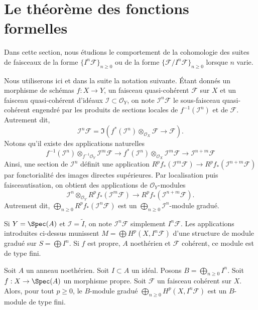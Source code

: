 \section{Le théorème des fonctions formelles}
\label{section-theorem-formal-functions}

\noindent
Dans cette section, nous étudions le comportement de la cohomologie
des suites de faisceaux de la forme $\{I^n\mathcal{F}\}_{n \geq 0}$
ou de la forme $\{\mathcal{F}/I^n\mathcal{F}\}_{n \geq 0}$ lorsque
$n$ varie.

\medskip\noindent
Nous utiliserons ici et dans la suite la notation suivante.
Étant donnés un morphisme de schémas $f : X \to Y$, un faisceau quasi-cohérent
$\mathcal{F}$ sur $X$ et un faisceau quasi-cohérent d'idéaux
$\mathcal{I} \subset \mathcal{O}_Y$, on note
$\mathcal{I}^n\mathcal{F}$ le sous-faisceau quasi-cohérent engendré
par les produits de sections locales de $f^{-1}(\mathcal{I}^n)$ et de
$\mathcal{F}$. Autrement dit,
$$
\mathcal{I}^n\mathcal{F}
=
\Im\left(
f^*(\mathcal{I}^n) \otimes_{\mathcal{O}_X} \mathcal{F}
\longrightarrow
\mathcal{F}
\right).
$$
Notons qu'il existe des applications naturelles
$$
f^{-1}(\mathcal{I}^n) \otimes_{f^{-1}\mathcal{O}_Y} \mathcal{I}^m\mathcal{F}
\longrightarrow
f^*(\mathcal{I}^n) \otimes_{\mathcal{O}_X} \mathcal{I}^m\mathcal{F}
\longrightarrow
\mathcal{I}^{n + m}\mathcal{F}
$$
Ainsi, une section de $\mathcal{I}^n$ définit une
application $R^pf_*(\mathcal{I}^m\mathcal{F}) \to
R^pf_*(\mathcal{I}^{n + m}\mathcal{F})$ par fonctorialité
des images directes supérieures. Par localisation puis faisceautisation, on
obtient des applications de $\mathcal{O}_Y$-modules
$$
\mathcal{I}^n \otimes_{\mathcal{O}_Y} R^pf_*(\mathcal{I}^m\mathcal{F})
\longrightarrow
R^pf_*(\mathcal{I}^{n + m}\mathcal{F}).
$$
Autrement dit,
$\bigoplus_{n \geq 0} R^pf_*(\mathcal{I}^n\mathcal{F})$
est un $\bigoplus_{n \geq 0} \mathcal{I}^n$-module gradué.

\medskip\noindent
Si $Y = \Spec(A)$ et $\mathcal{I} = \widetilde{I}$, on note
$\mathcal{I}^n\mathcal{F}$ simplement $I^n\mathcal{F}$. Les applications
introduites ci-dessus munissent $M = \bigoplus H^p(X, I^n\mathcal{F})$ d'une
structure de module gradué sur $S = \bigoplus I^n$. Si $f$ est propre,
$A$ noethérien et $\mathcal{F}$ cohérent, ce module
est de type fini.

\begin{lemma}
\label{lemma-cohomology-powers-ideal-times-F}
\begin{reference}
\cite[III Cor 3.3.2]{EGA}
\end{reference}
Soit $A$ un anneau noethérien.
Soit $I \subset A$ un idéal.
Posons $B = \bigoplus_{n \geq 0} I^n$.
Soit $f : X \to \Spec(A)$ un morphisme propre.
Soit $\mathcal{F}$ un faisceau cohérent sur $X$.
Alors, pour tout $p \geq 0$, le $B$-module gradué
$\bigoplus_{n \geq 0} H^p(X, I^n\mathcal{F})$ est
un $B$-module de type fini.
\end{lemma}

